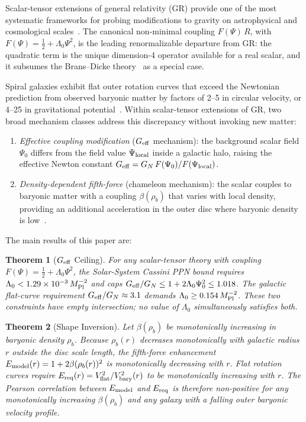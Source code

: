 \documentclass[12pt,a4paper]{article}
\theoremstyle{plain}
\newtheorem{theorem}{Theorem}
\newcommand{\Mpl}{M_{\rm Pl}}
\newcommand{\Geff}{G_{\rm eff}}
\newcommand{\rhob}{\rho_b}
\newcommand{\Vbary}{V_{\rm bary}}
\begin{document}
Scalar-tensor extensions of general relativity (GR) provide one of the
most systematic frameworks for probing modifications to gravity on
astrophysical and cosmological scales~\cite{BransDicke1961,Bergmann1968,
Faraoni2004,Clifton2012}.  The canonical non-minimal coupling
$F(\Psi)\,R$, with $F(\Psi) = \tfrac{1}{2} + \Lambda_0\Psi^2$, is the
leading renormalizable departure from GR: the quadratic term is the
unique dimension-4 operator available for a real scalar, and it subsumes
the Brans--Dicke theory~\cite{BransDicke1961,Damour1992} as a special
case.

Spiral galaxies exhibit flat outer rotation curves that exceed the
Newtonian prediction from observed baryonic matter by factors of 2--5 in
circular velocity, or 4--25 in gravitational potential~\cite{FamaeyMcGaugh2012,
McGaughLelli2016}.  Within scalar-tensor extensions of GR, two broad
mechanism classes address this discrepancy without invoking new matter:
\begin{enumerate}
  \item \emph{Effective coupling modification} ($G_{\rm eff}$ mechanism):
        the background scalar field $\Psi_0$ differs from the field value
        $\Psi_{\rm local}$ inside a galactic halo, raising the effective
        Newton constant $\Geff = G_N\,F(\Psi_0)/F(\Psi_{\rm local})$.
  \item \emph{Density-dependent fifth-force} (chameleon mechanism):
        the scalar couples to baryonic matter with a coupling $\beta(\rhob)$
        that varies with local density, providing an additional acceleration
        in the outer disc where baryonic density is low~\cite{KhouryWeltman2004a,
        KhouryWeltman2004b,HinterbichlerKhoury2010}.
\end{enumerate}

The main results of this paper are:
\setcounter{theorem}{2}
\begin{theorem}[$G_{\rm eff}$ Ceiling]
\label{thm:geff}
For any scalar-tensor theory with coupling $F(\Psi) = \tfrac{1}{2} +
\Lambda_0\Psi^2$, the Solar-System Cassini PPN bound requires $\Lambda_0
< 1.29\times10^{-3}\,\Mpl^{-2}$ and caps $G_{\rm eff}/G_N \leq 1 +
2\Lambda_0\Psi_0^2 \leq 1.018$.  The galactic flat-curve requirement
$G_{\rm eff}/G_N \approx 3.1$ demands $\Lambda_0 \geq 0.154\,\Mpl^{-2}$.
These two constraints have empty intersection; no value of $\Lambda_0$
simultaneously satisfies both.
\end{theorem}

\begin{theorem}[Shape Inversion]
\label{thm:shape}
Let $\beta(\rhob)$ be monotonically increasing in baryonic density
$\rhob$.  Because $\rhob(r)$ decreases monotonically with galactic radius
$r$ outside the disc scale length, the fifth-force enhancement $E_{\rm
model}(r) = 1 + 2\beta(\rhob(r))^2$ is monotonically decreasing with
$r$.  Flat rotation curves require $E_{\rm req}(r) = V_{\rm flat}^2/
\Vbary^2(r)$ to be monotonically increasing with $r$.  The Pearson
correlation between $E_{\rm model}$ and $E_{\rm req}$ is therefore
non-positive for any monotonically increasing $\beta(\rhob)$ and any
galaxy with a falling outer baryonic velocity profile.
\end{theorem}
\end{document}

